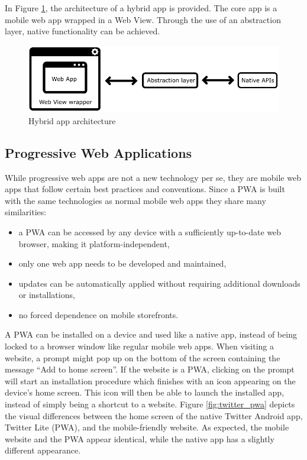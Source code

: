 \documentclass[a4paper,12pt]{article}
\begin{document}
In Figure \ref{fig:hybridapp}, the architecture of a hybrid app is provided. The core app is a mobile web app wrapped in a Web View. Through the use of an abstraction layer, native functionality can be achieved.

\begin{figure}[h]%
	\centering
	\includegraphics[height=3cm]{img/Other/struct_hybrid.png}
	\caption{Hybrid app architecture}%
	\label{fig:hybridapp}%
\end{figure}

\subsection{Progressive Web Applications}
\label{Theory_PWA}
While progressive web apps are not a new technology per se, they are mobile web apps that follow certain best practices and conventions. Since a PWA is built with the same technologies as normal mobile web apps they share many similarities:

\begin{itemize}
    \item a PWA can be accessed by any device with a sufficiently up-to-date web browser, making it platform-independent,
    \item only one web app needs to be developed and maintained,
    \item updates can be automatically applied without requiring additional downloads or installations,
    \item no forced dependence on mobile storefronts.
\end{itemize}

A PWA can be installed on a device and used like a native app, instead of being locked to a browser window like regular mobile web apps. When visiting a website, a prompt might pop up on the bottom of the screen containing the message “Add to home screen”. If the website is a PWA, clicking on the prompt will start an installation procedure which finishes with an icon appearing on the device’s home screen. This icon will then be able to launch the installed app, instead of simply being a shortcut to a website. Figure \ref{fig:twitter_pwa} depicts the visual differences between the home screen of the native Twitter Android app, Twitter Lite (PWA), and the mobile-friendly website. As expected, the mobile website and the PWA appear identical, while the native app has a slightly different appearance.
\end{document}
